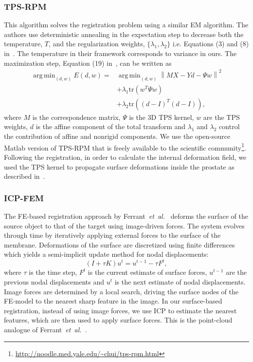 \documentclass[journal]{IEEEtran}
\newcommand{\trans}[1]{#1^{\scriptscriptstyle T}}
\newcommand{\trace}{\mathrm{tr}}
\DeclareMathOperator*{\argmin}{arg\,min}
\begin{document}
\subsubsection{TPS-RPM}\label{sec:tpsrpm}
This algorithm solves the registration problem using a similar EM algorithm. The authors use deterministic annealing in the expectation step to decrease both the temperature, $T$, and the regularization weights, $\{\lambda_1, \lambda_2\}$ i.e. Equations (3) and (8) in~\cite{Chui03a}. The temperature in their framework corresponds to variance in ours. The maximization step, Equation (19) in~\cite{Chui03a}, can be written as
\begin{align}
\argmin_{(d,w)} E(d,w) = & \argmin_{(d,w)} \left\|MX-Yd-{\Psi}w\right\|^2 \nonumber\\
  & + {\lambda_1}\trace({\trans{w}{\Psi}w})\nonumber\\
  & + {\lambda_2}\trace({\trans{(d-I)}(d-I)}), \label{eq:tpsrpm}
\end{align}
where $M$ is the correspondence matrix, $\Psi$ is the 3D TPS kernel, $w$ are the TPS weights, $d$ is the affine component of the total transform and $\lambda_1$ and $\lambda_2$ control the contribution of affine and nonrigid components. We use the open-source Matlab version of TPS-RPM that is freely available to the scientific community\footnote{\url{http://noodle.med.yale.edu/~chui/tps-rpm.html}}. Following the registration, in order to calculate the internal deformation field, we used the TPS kernel to propagate surface deformations inside the prostate as described in~\cite{Sibson91a}.
\subsubsection{ICP-FEM}\label{sec:icpfem}
The FE-based registration approach by Ferrant~\textit{et~al.}~\cite{Ferrant01a} deforms the surface of the source object to that of the target using image-driven forces. The system evolves through time by iteratively applying external forces to the surface of the membrane. Deformations of the surface are discretized using finite differences which yields a semi-implicit update method for nodal displacements:
\begin{equation}\label{eq:icpfem}
(I+\tau{K})u^t = u^{t-1} - \tau{F^t},
\end{equation}
where $\tau$ is the time step, $F^t$ is the current estimate of surface forces, $u^{t-1}$ are the previous nodal displacements and $u^t$ is the next estimate of nodal displacements. Image forces are determined by a local search, driving the surface nodes of the FE-model to the nearest sharp feature in the image.  In our surface-based registration, instead of using image forces, we use ICP to estimate the nearest features, which are then used to apply surface forces. This is the point-cloud analogue of Ferrant~\textit{et~al.}~\cite{Ferrant01a}.
\end{document}
